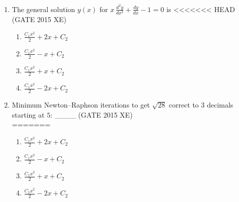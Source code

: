 \documentclass[journal,12pt,onecolumn]{IEEEtran}
\begin{document}
\begin{enumerate}
\begin{enumerate}[label=\arabic*)]
\begin{multicols}{4}
<<<<<<< HEAD
\end{multicols}
=======

\vspace{0.5cm}
>>>>>>> d734831 (Assignment)

\item The general solution $y(x)$ for  
$x\,\frac{d^2y}{dx^2} + \frac{dy}{dx} - 1 = 0$
is  
<<<<<<< HEAD
\hfill{(GATE 2015 XE)} \\

\begin{multicols}{4}
\begin{enumerate}
\item $\frac{C_1x^2}{2} + 2x + C_2$
\item $\frac{C_1x^2}{2} - x + C_2$
\item $\frac{C_1x^2}{2} + x + C_2$
\item $\frac{C_1x^2}{2} - 2x + C_2$
\end{enumerate}
\end{multicols}


\item Minimum Newton–Raphson iterations to get $\sqrt{28}$ correct to $3$ decimals starting at $5$: \_\_\_\_
\hfill{(GATE 2015 XE)} \\
=======
\hfill{} \\

\vspace{0.2cm}
\begin{enumerate}[label=\alph*)]
\item $\frac{C_1x^2}{2} + 2x + C_2$
\vspace{0.1cm}
\item $\frac{C_1x^2}{2} - x + C_2$
\vspace{0.1cm}
\item $\frac{C_1x^2}{2} + x + C_2$
\vspace{0.1cm}
\item $\frac{C_1x^2}{2} - 2x + C_2$
\end{enumerate}


\end{enumerate}
\end{enumerate}
\end{document}
